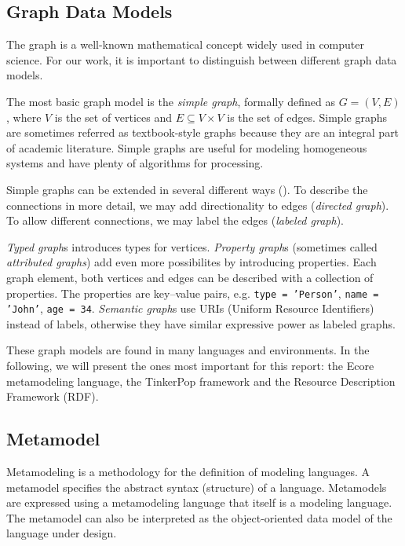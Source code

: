 \subsection{Graph Data Models}

The graph is a well-known mathematical concept widely used in computer science. For our work, it is important to distinguish between different graph data models.


The most basic graph model is the \emph{simple graph}, formally defined as $G = (V, E)$, where $V$ is the set of vertices and $E \subseteq V \times V$ is the set of edges. Simple graphs are sometimes referred as textbook-style graphs because they are an integral part of academic literature. Simple graphs are useful for modeling homogeneous systems and have plenty of algorithms for processing.

Simple graphs can be extended in several different ways (). To describe the connections in more detail, we may add directionality to edges (\emph{directed graph}). To allow different connections, we may label the edges (\emph{labeled graph}). 

\emph{Typed graph}s introduces types for vertices. \emph{Property graph}s (sometimes called \emph{attributed graphs}) add even more possibilites by introducing properties. Each graph element, both vertices and edges can be described with a collection of properties. The properties are key--value pairs, e.g. \texttt{type = 'Person'}, \texttt{name = 'John'}, \texttt{age = 34}. \emph{Semantic graph}s use URIs (Uniform Resource Identifiers) instead of labels, otherwise they have similar expressive power as labeled graphs. 


These graph models are found in many languages and environments. In the following, we will present the ones most important for this report: the Ecore metamodeling language, the TinkerPop framework and the Resource Description Framework (RDF).

\subsection{Metamodel}

Metamodeling is a methodology for the definition of modeling languages. A metamodel specifies the abstract syntax (structure) of a language. Metamodels are expressed using a metamodeling language that itself is a modeling language. The metamodel can also be interpreted as the object-oriented data model of the language under design.

